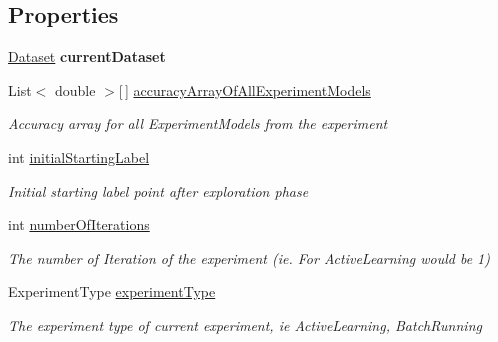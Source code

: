 \subsection*{Properties}
\begin{DoxyCompactItemize}
\item 
\hypertarget{class_acrive_crowd_g_u_i_1_1_experiment_setting_aceffb9b1794008e2a256bfbfa85fd619}{}\hyperlink{class_acrive_crowd_g_u_i_1_1_dataset}{Dataset} {\bfseries current\+Dataset}\label{class_acrive_crowd_g_u_i_1_1_experiment_setting_aceffb9b1794008e2a256bfbfa85fd619}

\item 
List$<$ double $>$\mbox{[}$\,$\mbox{]} \hyperlink{class_acrive_crowd_g_u_i_1_1_experiment_setting_a4cfce5c599a60eb6816feb41a48bc253}{accuracy\+Array\+Of\+All\+Experiment\+Models}
\begin{DoxyCompactList}\small\item\em Accuracy array for all Experiment\+Models from the experiment \end{DoxyCompactList}\item 
int \hyperlink{class_acrive_crowd_g_u_i_1_1_experiment_setting_a85910797cd67b7f06b34ddef708daf8b}{initial\+Starting\+Label}
\begin{DoxyCompactList}\small\item\em Initial starting label point after exploration phase \end{DoxyCompactList}\item 
int \hyperlink{class_acrive_crowd_g_u_i_1_1_experiment_setting_a21043775ebb676571dd367a3d2afabf0}{number\+Of\+Iterations}
\begin{DoxyCompactList}\small\item\em The number of Iteration of the experiment (ie. For Active\+Learning would be 1) \end{DoxyCompactList}\item 
Experiment\+Type \hyperlink{class_acrive_crowd_g_u_i_1_1_experiment_setting_a4063f11ac4e345ecbee8a5e291a397e7}{experiment\+Type}
\begin{DoxyCompactList}\small\item\em The experiment type of current experiment, ie Active\+Learning, Batch\+Running \end{DoxyCompactList}\end{DoxyCompactItemize}


